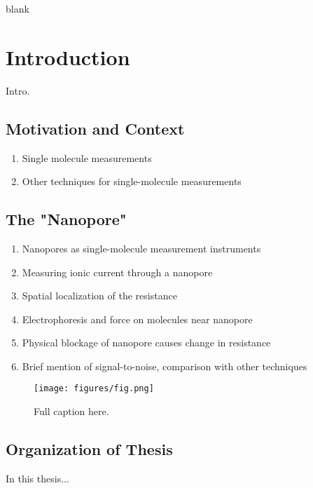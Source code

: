 \begin{savequote}[75mm]
blank
\end{savequote}

\chapter{Introduction}
\label{introduction}

Intro.

\section{Motivation and Context}

\begin{enumerate}
\item Single molecule measurements
\item Other techniques for single-molecule measurements
\end{enumerate}

\section{The "Nanopore"}

\begin{enumerate}
\item Nanopores as single-molecule measurement instruments
\item Measuring ionic current through a nanopore
\item Spatial localization of the resistance
\item Electrophoresis and force on molecules near nanopore
\item Physical blockage of nanopore causes change in resistance
\item Brief mention of signal-to-noise, comparison with other techniques
\end{enumerate}

\begin{figure}[h]
\begin{centering}
\texttt{[image: figures/fig.png]}
\caption[Brief caption]{Full caption here.}
\label{fig:Figlabel}
\end{centering}
\end{figure}

\section{Organization of Thesis}

In this thesis... \cite{Bryant1994} \cite{Vercoutere2001}